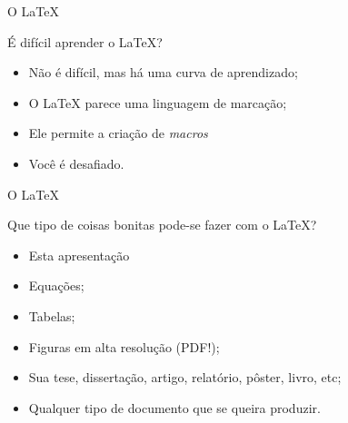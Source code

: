 \documentclass[10pt]{beamer}
\begin{document}
\begin{frame}{O \LaTeX{}}
	\begin{block}{É difícil aprender o \LaTeX{}?}
		\begin{itemize}
			\item {} Não é difícil, mas há uma curva de aprendizado;
			\item {} O \LaTeX{} parece uma linguagem de marcação;
			\item {} Ele permite a criação de \textit{macros}\footnotemark[1]
			\item {} Você é desafiado.
			\only<4->
		\end{itemize}
	\end{block}
\end{frame}

\begin{frame}{O \LaTeX{}}
	\begin{block}{Que tipo de coisas bonitas pode-se fazer com o \LaTeX{}?}
		\begin{itemize}
			\item {} Esta apresentação {\large\Cooley}\footnotemark[1]
			\item {} Equações;
			\item {} Tabelas;
			\item {} Figuras em alta resolução (PDF!);
			\item {} Sua tese, dissertação, artigo, relatório, pôster, livro, etc;
			\item {} Qualquer tipo de documento que se queira produzir.
			\only<2->
		\end{itemize}
	\end{block}
\end{frame}
\end{document}
